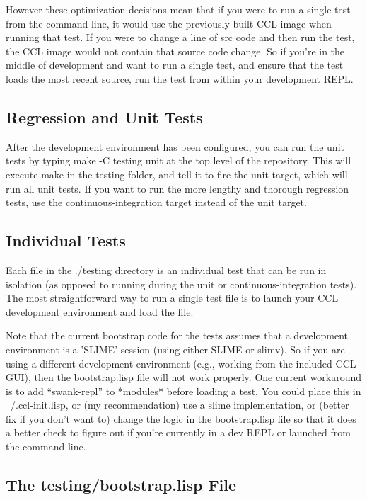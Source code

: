 \documentclass[12pt]{article} %
\begin{document}
However these optimization decisions mean that if you were to run a single test from the command line, it would use the previously-built CCL image when running that test.
If you were to change a line of src code and then run the test, the CCL image would not contain that source code change.
So if you're in the middle of development and want to run a single test, and ensure that the test loads the most recent source, run the test from within your development REPL.

\subsection{Regression and Unit Tests}

After the development environment has been configured, you can run the unit tests by typing make -C testing unit at the top level of the repository.
This will execute make in the testing folder, and tell it to fire the unit target, which will run all unit tests.
If you want to run the more lengthy and thorough regression tests, use the continuous-integration target instead of the unit target.

\subsection{Individual Tests}

Each file in the ./testing directory is an individual test that can be run in isolation (as opposed to running during the unit or continuous-integration tests).
The most straightforward way to run a single test file is to launch your CCL development environment and load the file.

Note that the current bootstrap code for the tests assumes that a development environment is a 'SLIME' session (using either SLIME or slimv).
So if you are using a different development environment (e.g., working from the included CCL GUI), then the bootstrap.lisp file will not work properly.
One current workaround is to add ``swank-repl'' to *modules* before loading a test.
You could place this in ~/.ccl-init.lisp, or (my recommendation) use a slime implementation, or
(better fix if you don't want to) change the logic in the bootstrap.lisp file so that it does a better check to figure out if you're currently in a dev REPL or launched from the command line.

\subsection{The testing/bootstrap.lisp File}
\end{document}

